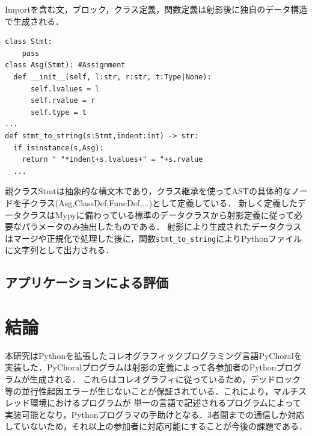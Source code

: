 \documentclass{resume}
\begin{document}
Importを含む文，ブロック，クラス定義，関数定義は射影後に独自のデータ構造で生成される．
\begin{lstlisting}[caption=data.py,label=data]
class Stmt:
    pass
class Asg(Stmt): #Assignment
  def __init__(self, l:str, r:str, t:Type|None):
      self.lvalues = l
      self.rvalue = r
      self.type = t
... 
def stmt_to_string(s:Stmt,indent:int) -> str:
  if isinstance(s,Asg):
    return " "*indent+s.lvalues+" = "+s.rvalue
  ... 
\end{lstlisting}
親クラス\textsf{Stmt}は抽象的な構文木であり，クラス継承を使ってASTの具体的なノードを子クラス(\textsf{Asg,ClassDef,FuncDef,...})として定義している．
新しく定義したデータクラスはMypyに備わっている標準のデータクラスから射影定義に従って必要なパラメータのみ抽出したものである．
射影により生成されたデータクラスはマージや正規化で処理した後に，関数\texttt{stmt\_to\_string}によりPythonファイルに文字列として出力される．


\subsection{アプリケーションによる評価}

\section{結論}
本研究はPythonを拡張したコレオグラフィックプログラミング言語PyChoralを実装した．PyChoralプログラムは射影の定義によって各参加者のPythonプログラムが生成される．
これらはコレオグラフィに従っているため，デッドロック等の並行性起因エラーが生じないことが保証されている．これにより，マルチスレッド環境におけるプログラムが
単一の言語で記述されるプログラムによって実装可能となり，Pythonプログラマの手助けとなる．3者間までの通信しか対応していないため，それ以上の参加者に対応可能にすることが今後の課題である．

\end{document}
